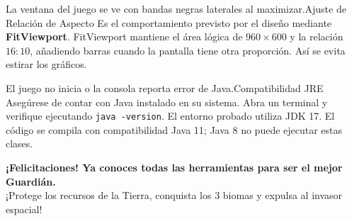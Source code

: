 \documentclass[11pt,a4paper]{article}
\begin{document}
\vspace{0.4cm}

\begin{tarjetaitem}{La ventana del juego se ve con bandas negras laterales al maximizar.}{Ajuste de Relación de Aspecto}
    Es el comportamiento previsto por el diseño mediante \textbf{FitViewport}. FitViewport mantiene el área lógica de $960 \times 600$ y la relación $16:10$, añadiendo barras cuando la pantalla tiene otra proporción. Así se evita estirar los gráficos.
\end{tarjetaitem}

\vspace{0.4cm}

\begin{tarjetaitem}{El juego no inicia o la consola reporta error de Java.}{Compatibilidad JRE}
    Asegúrese de contar con Java instalado en su sistema. Abra un terminal y verifique ejecutando \texttt{java -version}. El entorno probado utiliza JDK 17. El código se compila con compatibilidad Java 11; Java 8 no puede ejecutar estas clases.
\end{tarjetaitem}

\vspace{0.2cm}

\begin{center}
    \begin{tcolorbox}[
        enhanced,
        colback=NavyDark,
        colframe=CyanBright,
        arc=3mm,
        width=0.9\textwidth,
        boxrule=1.2pt,
        halign=center
    ]
        {\sffamily\bfseries\color{white} ¡Felicitaciones! Ya conoces todas las herramientas para ser el mejor Guardián.}\\[0.15cm]
        {\sffamily\color{CyanBright} ¡Protege los recursos de la Tierra, conquista los 3 biomas y expulsa al invasor espacial!}
    \end{tcolorbox}
\end{center}

\endgroup

\end{document}
